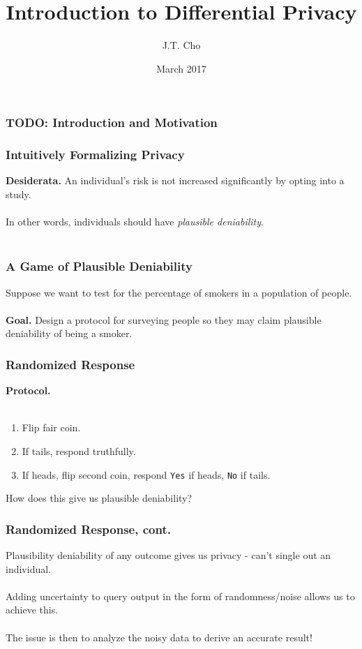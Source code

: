 \documentclass[aspectratio=169]{beamer}
\title{Introduction to Differential Privacy}
\author{J.T. Cho}
\institute{CIS700-003 | University of Pennsylvania}
\date{March 2017}
\begin{document}
\begin{frame}
\titlepage
\end{frame}

\begin{frame}
\frametitle{TODO: Introduction and Motivation}
\end{frame}

\begin{frame}
\frametitle{Intuitively Formalizing Privacy}

\textbf{Desiderata.} An individual's risk is not increased significantly by opting into a study.\\~\\

In other words, individuals should have \textit{plausible deniability}.\\~\\
\end{frame}

\begin{frame}
\frametitle{A Game of Plausible Deniability}
  Suppose we want to test for the percentage of smokers in a population of people.\\~\\

  \textbf{Goal.} Design a protocol for surveying people so they may claim plausible deniability of being a smoker.
\end{frame}

\begin{frame}
\frametitle{Randomized Response}
\textbf{Protocol.}\\~\\
\begin{enumerate}
  \item Flip fair coin.
  \item If tails, respond truthfully.
  \item If heads, flip second coin, respond \texttt{Yes} if heads, \texttt{No} if tails.
\end{enumerate}

How does this give us plausible deniability?
\end{frame}

\begin{frame}
\frametitle{Randomized Response, cont.}
  Plausibility deniability of any outcome gives us privacy - can't single out an individual. \\~\\

  Adding uncertainty to query output in the form of randomness/noise allows us to achieve this.\\~\\

  The issue is then to analyze the noisy data to derive an accurate result!

\end{frame}
\end{document}
